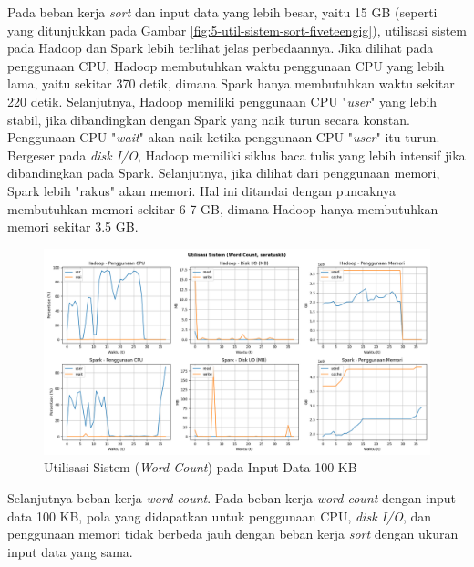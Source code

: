 \newpage
Pada beban kerja \textit{sort} dan input data yang lebih besar, yaitu 15 GB (seperti yang ditunjukkan pada Gambar \ref{fig:5-util-sistem-sort-fiveteengig}), utilisasi sistem pada Hadoop dan Spark lebih terlihat jelas perbedaannya. Jika dilihat pada penggunaan CPU, Hadoop membutuhkan waktu penggunaan CPU yang lebih lama, yaitu sekitar 370 detik, dimana Spark hanya membutuhkan waktu sekitar 220 detik. Selanjutnya, Hadoop memiliki penggunaan CPU "\textit{user}" yang lebih stabil, jika dibandingkan dengan Spark yang naik turun secara konstan. Penggunaan CPU "\textit{wait}" akan naik ketika penggunaan CPU "\textit{user}" itu turun. Bergeser pada \textit{disk I/O}, Hadoop memiliki siklus baca tulis yang lebih intensif jika dibandingkan pada Spark. Selanjutnya, jika dilihat dari penggunaan memori, Spark lebih "rakus" akan memori. Hal ini ditandai dengan puncaknya membutuhkan memori sekitar 6-7 GB, dimana Hadoop hanya membutuhkan memori sekitar 3.5 GB.

\begin{figure}[h]
    \centering
    \includegraphics[width=1\textwidth]{figures/ch04/5-util-sistem-wordcount-seratuskb}
    \caption{Utilisasi Sistem (\textit{Word Count}) pada Input Data 100 KB}
    \label{fig:5-util-sistem-wordcount-seratuskb}
\end{figure}

Selanjutnya beban kerja \textit{word count}. Pada beban kerja \textit{word count} dengan input data 100 KB, pola yang didapatkan untuk penggunaan CPU, \textit{disk I/O}, dan penggunaan memori tidak berbeda jauh dengan beban kerja \textit{sort} dengan ukuran input data yang sama. 

